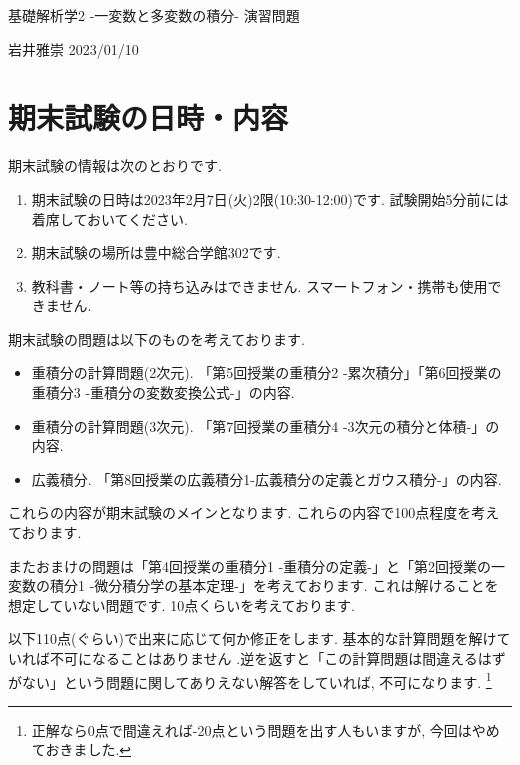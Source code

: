 \documentclass[dvipdfmx,a4paper,11pt]{article}
\theoremstyle{definition}
\begin{document}
\begin{center}
{\Large 基礎解析学2 -一変数と多変数の積分- 演習問題}
\end{center}

\begin{flushright}
 岩井雅崇 2023/01/10
\end{flushright}

\section{期末試験の日時・内容}

期末試験の情報は次のとおりです.
\begin{enumerate}
\setlength{\parskip}{0cm}
  \setlength{\itemsep}{2pt} 
\item 期末試験の日時は2023年2月7日(火)2限(10:30-12:00)です. 試験開始5分前には着席しておいてください.
\item 期末試験の場所は豊中総合学館302です. 
\item 教科書・ノート等の持ち込みはできません. スマートフォン・携帯も使用できません.
\end{enumerate}

\hspace{-20pt}
期末試験の問題は以下のものを考えております.

\begin{itemize}
\setlength{\parskip}{0cm}
  \setlength{\itemsep}{2pt} 
\item 重積分の計算問題(2次元). 「第5回授業の重積分2 -累次積分」「第6回授業の重積分3 -重積分の変数変換公式-」の内容.
\item 重積分の計算問題(3次元). 「第7回授業の重積分4 -3次元の積分と体積-」の内容.
\item 広義積分. 「第8回授業の広義積分1-広義積分の定義とガウス積分-」の内容.
\end{itemize}
これらの内容が期末試験のメインとなります. これらの内容で100点程度を考えております. 

またおまけの問題は「第4回授業の重積分1 -重積分の定義-」と「第2回授業の一変数の積分1 -微分積分学の基本定理-」を考えております. これは解けることを想定していない問題です. 10点くらいを考えております. 

以下110点(ぐらい)で出来に応じて何か修正をします. 基本的な計算問題を解けていれば不可になることはありません .逆を返すと「この計算問題は間違えるはずがない」という問題に関してありえない解答をしていれば, 不可になります. \footnote{正解なら0点で間違えれば-20点という問題を出す人もいますが, 今回はやめておきました.}
\end{document}
